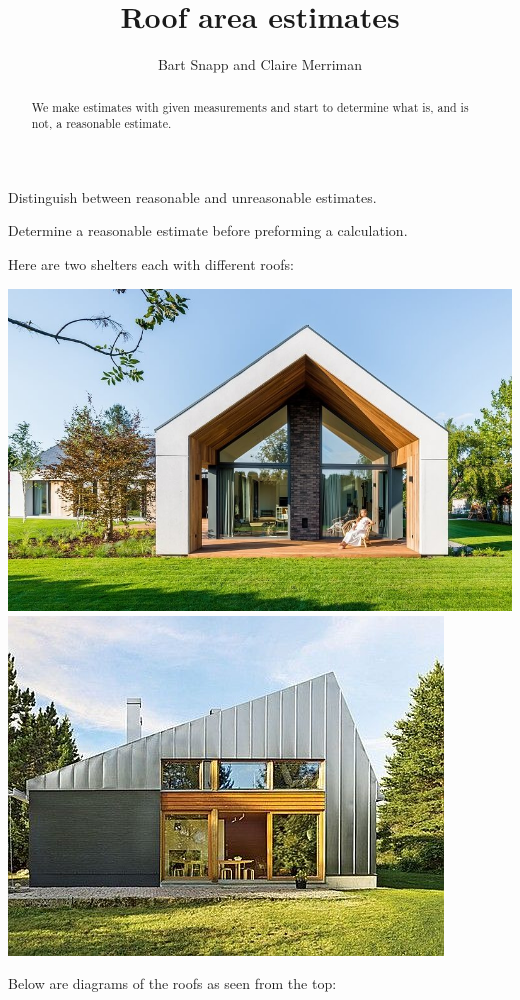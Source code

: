 \documentclass[handout,nooutcomes,noauthor,hints]{ximera}
\title{Roof area estimates}
\author{Bart Snapp and Claire Merriman}
\begin{document}
\begin{abstract}
 We make estimates with given measurements and start to determine what
 is, and is not, a reasonable estimate.
\end{abstract}
\maketitle

\begin{listOutcomes}
\item Distinguish between reasonable and unreasonable estimates.
\item Determine a reasonable estimate before preforming a calculation.
\end{listOutcomes}

\mynewpage
\begin{question}
Here are two shelters each with different roofs:
\begin{center}
  \includegraphics[height=.3\textwidth]{../formulasGalore/symRoof.jpg}\qquad \includegraphics[height=.3\textwidth]{../formulasGalore/skewRoof.jpg}
\end{center}
  Below are diagrams of the roofs as seen from the top:
  \begin{center}
\end{center}
\end{question}
\end{document}
